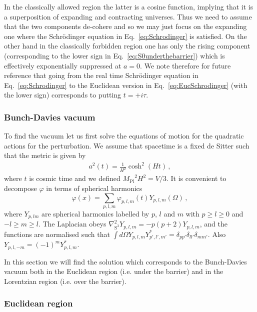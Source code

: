 \documentclass[a4paper,11pt]{article}
\numberwithin{equation}{section}
\newcommand{\mpl}{{M_{\mathrm{Pl}}}}
\numberwithin{equation}{section}
\begin{document}
 In the classically allowed region the latter is a cosine function, implying that it is a superposition of expanding and contracting universes. Thus we need to assume that the two components de-cohere and so we may just focus on the expanding one where the Schr\"odinger equation in Eq.~\eqref{eq:Schrodinger} is satisfied. On the other hand in the classically forbidden region one has only the rising component (corresponding to the lower sign in Eq.~\eqref{eq:S0underthebarrier}) which is effectively exponentially suppressed at $a=0$.  We note therefore for future reference that going from the real time Schr\"odinger equation in Eq.~\eqref{eq:Schrodinger} to the Euclidean version in Eq.~\eqref{eq:EucSchrodinger} (with the lower sign) corresponds to putting $t=+i\tau$.
 
 \subsubsection{Bunch-Davies vacuum}

To find the vacuum let us first solve the equations of motion for the quadratic actions for the perturbation. We assume that spacetime is a fixed de Sitter such that the metric is given by \begin{align}
a^2(t)=\frac{1}{H^2}\cosh^2 (H t) \,,
\end{align}
where $t$ is cosmic time and we defined $\mpl^{2}H^2=V/3$.
It is convenient to decompose $\varphi$ in terms of spherical harmonics
\begin{equation}
\varphi(x)=\sum _{p, l, m}\varphi_{p, l, m}(t)Y_{p, l, m}(\Omega) \,,
\end{equation}
where $Y_{p, l m} $ are spherical harmonics labelled by $p$, $l$ and $m$ with $p \geq l \geq 0$ and $-l \geq m \geq l$. 
The Laplacian obeys $\nabla^2_{\mathrm{S}^3}Y_{p, l, m}=-p(p+2)Y_{p, l, m}$, and the functions are normalised such that $\int d\Omega Y_{p, l, m}Y^*_{p', l', m'}=\delta_{pp'}\delta_{ll'}\delta_{mm'}$. Also  $Y_{p, l, -m} = (-1)^{m}Y^*_{p,  l, m}$.

In this section we will find the solution which corresponds to the Bunch-Davies vacuum both in the Euclidean region (i.e. under the barrier) and in the Lorentzian region (i.e. over the barrier).

\subsubsection*{Euclidean region}
\end{document}
